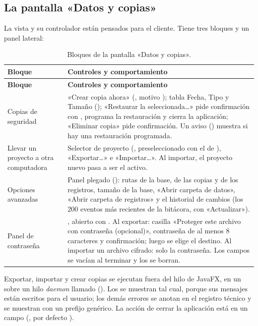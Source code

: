 \subsection{La pantalla «Datos y copias»}

La vista  y su controlador  están pensados para el
cliente. Tiene tres bloques y un panel lateral:

\begin{longtable}{L{3.8cm}L{10.0cm}}
	\caption{Bloques de la pantalla «Datos y copias».} \label{tab:bd-pantalla} \\
	\hline
	\textbf{Bloque} & \textbf{Controles y comportamiento} \\ \hline
	\endfirsthead
	\hline
	\textbf{Bloque} & \textbf{Controles y comportamiento} \\ \hline
	\endhead
	\hline
	\endfoot
	Copias de seguridad & «Crear copia ahora» (, motivo ); tabla Fecha, Tipo y
	Tamaño (); «Restaurar la seleccionada\ldots» pide confirmación con
	, programa la restauración y cierra la aplicación; «Eliminar copia» pide
	confirmación. Un aviso () muestra si hay una restauración programada. \\
	Llevar un proyecto a otra computadora & Selector de proyecto (, preseleccionado con el de
	), «Exportar\ldots» e «Importar\ldots». Al importar, el proyecto nuevo pasa a ser el activo. \\
	Opciones avanzadas & Panel plegado (): rutas de la base, de las copias y de los registros,
	tamaño de la base, «Abrir carpeta de datos», «Abrir carpeta de registros» y el historial de cambios (los 200
	eventos más recientes de la bitácora, con «Actualizar»). \\
	Panel de contraseña & , abierto con . Al exportar:
	casilla «Proteger este archivo con contraseña (opcional)», contraseña de al menos 8 caracteres y confirmación; luego
	se elige el destino. Al importar un archivo cifrado: solo la contraseña. Los campos se vacían al terminar y los
	 se borran. \\
\end{longtable}

Exportar, importar y crear copias se ejecutan fuera del hilo de JavaFX, en un  sobre un hilo \emph{daemon}
llamado  (). Los  se muestran tal cual,
porque sus mensajes están escritos para el usuario; los demás errores se anotan en el registro técnico y se muestran con
un prefijo genérico. La acción de cerrar la aplicación está en un campo (, por
defecto ).
